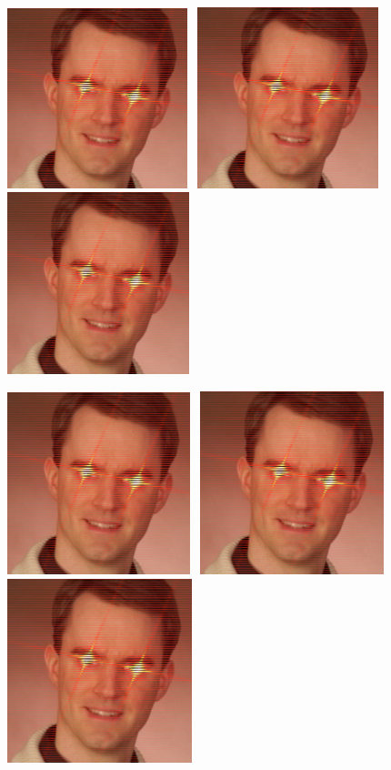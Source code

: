 \documentclass{article}
\begin{document}
\includegraphics[height=2.06in]{bastian_interlaced.png}~
\includegraphics[height=2.07in]{bastian_interlaced.png}~
\includegraphics[height=2.08in]{bastian_interlaced.png}

\vspace{1em}

\includegraphics[height=2.09in]{bastian_interlaced.png}~
\includegraphics[height=2.10in]{bastian_interlaced.png}~
\includegraphics[height=2.11in]{bastian_interlaced.png}
\end{document}
